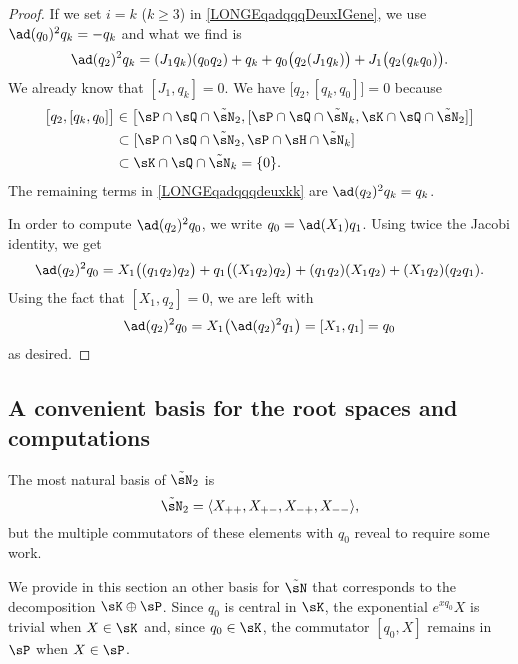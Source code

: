 \begin{proof}
	If we set $i=k$ ($k\geq 3$) in \eqref{LONGEqadqqqDeuxIGene}, we use $\ad(q_0)^2q_k=-q_k$ and what we find is
	\begin{equation}		\label{LONGEqadqqqdeuxkk}
		\ad(q_2)^2q_k=(J_1q_k)(q_0q_2)+q_k+q_0\big( q_2(J_1q_k) \big)+J_1\big( q_2(q_kq_0) \big).
	\end{equation}
	We already know that $[J_1,q_k]=0$. We have $\big[ q_2,[q_k,q_0] \big]=0$ because
	\begin{equation}
		\begin{aligned}[]
			\big[ q_2,[q_k,q_0] \big] & \in\big[ \sP\cap\sQ\cap\tilde\sN_2,[\sP\cap\sQ\cap\tilde\sN_k,\sK\cap\sQ\cap\tilde\sN_2] \big] \\
			                          & \subset[\sP\cap\sQ\cap\tilde\sN_2,\sP\cap\sH\cap\tilde\sN_k]                                   \\
			                          & \subset\sK\cap\sQ\cap\tilde\sN_k=\{ 0 \}.
		\end{aligned}
	\end{equation}
	The remaining terms in \eqref{LONGEqadqqqdeuxkk} are $\ad(q_2)^2q_k=q_k$.

	In order to compute $\ad(q_2)^2q_0$, we write $q_0=\ad(X_1)q_1$. Using twice the Jacobi identity, we get
	\begin{equation}
		\ad(q_2)^2q_0=X_1\big( (q_1q_2)q_2 \big)+q_1\big( (X_1q_2)q_2 \big)+(q_1q_2)(X_1q_2)+(X_1q_2)(q_2q_1).
	\end{equation}
	Using the fact that $[X_1,q_2]=0$, we are left with
	\begin{equation}
		\ad(q_2)^2q_0=X_1\big( \ad(q_2)^2q_1 \big)=[X_1,q_1]=q_0
	\end{equation}
	as desired.
\end{proof}


%
\subsection{A convenient basis for the root spaces and computations}
%
\label{LONGSubSecMOreConvBasisBlbla}
%

The most natural basis of $\tilde\sN_2$ is
\begin{equation}
	\tilde\sN_2=\langle X_{++},X_{+-},X_{-+},X_{--}\rangle,
\end{equation}
but the multiple commutators of these elements with $q_0$ reveal to require some work.

We provide in this section an other basis for $\tilde\sN$ that corresponds to the decomposition $\sK\oplus\sP$. Since $q_0$ is central in $\sK$, the exponential $e^{xq_0}X$ is trivial when $X\in\sK$ and, since $q_0\in\sK$, the commutator $[q_0,X]$ remains in $\sP$ when $X\in\sP$.

